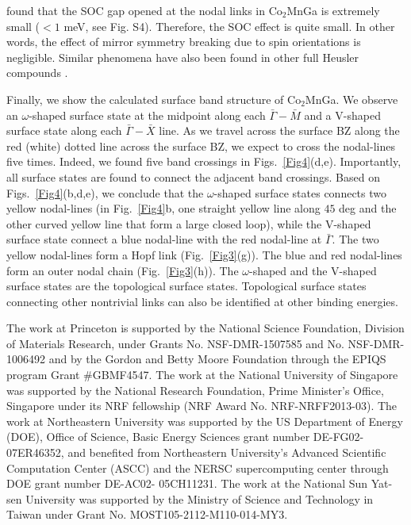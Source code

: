 \documentclass[aps,prl,superscriptaddress,twocolumn,showpacs]{revtex4-1}
\begin{document}
found that the SOC gap opened at the nodal links in Co$_2$MnGa is extremely small ($< 1$ meV, see Fig. S4). Therefore, the SOC effect is quite small. In other words, the effect of mirror symmetry breaking due to spin orientations is negligible. Similar phenomena have also been found in other full Heusler compounds \cite{Heusler_Wang, Heusler_Chang}.


Finally, we show the calculated surface band structure of Co$_2$MnGa. We observe an $\omega$-shaped surface state at the midpoint along each $\bar{\Gamma}-\bar{M}$ and a V-shaped surface state along each $\bar{\Gamma}-\bar{X}$ line. As we travel across the surface BZ along the red (white) dotted line across the surface BZ, we expect to cross the nodal-lines five times. Indeed, we found five band crossings in Figs.~\ref{Fig4}(d,e). Importantly, all surface states are found to connect the adjacent band crossings. Based on Figs.~\ref{Fig4}(b,d,e), we conclude that the $\omega$-shaped surface states connects two yellow nodal-lines (in Fig.~\ref{Fig4}b, one straight yellow line along $45$ deg and the other curved yellow line that form a large closed loop), while the  V-shaped surface state connect a blue nodal-line with the red nodal-line at $\bar{\Gamma}$. The two yellow nodal-lines form a Hopf link (Fig.~\ref{Fig3}(g)). The blue and red nodal-lines form an outer nodal chain (Fig.~\ref{Fig3}(h)). The $\omega$-shaped and the V-shaped surface states are the topological surface states. Topological surface states connecting other nontrivial links can also be identified at other binding energies.


The work at Princeton is supported by the National Science Foundation, Division of Materials Research, under Grants No. NSF-DMR-1507585 and No. NSF-DMR-1006492 and by the Gordon and Betty Moore Foundation through the EPIQS program Grant \#GBMF4547. The work at the National University of Singapore was supported by the National Research Foundation, Prime Minister's Office, Singapore under its NRF fellowship (NRF Award No. NRF-NRFF2013-03). The work at Northeastern University was supported by the US Department of Energy (DOE), Office of Science, Basic Energy Sciences grant number DE-FG02-07ER46352, and benefited from Northeastern University's Advanced Scientific Computation Center (ASCC) and the NERSC supercomputing center through DOE grant number DE-AC02- 05CH11231. The work at the National Sun Yat-sen University was supported by the Ministry of Science and Technology in Taiwan under Grant No. MOST105-2112-M110-014-MY3.
\end{document}
